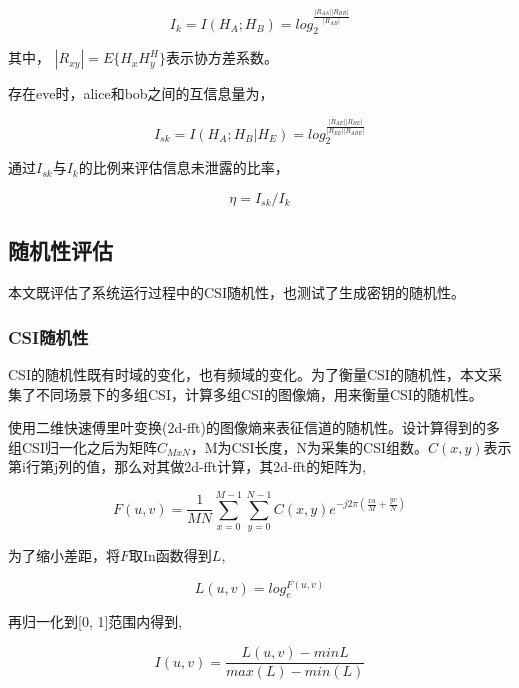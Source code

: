 \documentclass[master]{seuthesis} %
\begin{document}
\begin{Main}
\begin{equation}
    I_k = I(H_A; H_B) = log_2^{\frac{\left|R_{AA}\right|\left|R_{BB}\right|}{\left|R_{AB}\right|}}
\end{equation}

其中， $\left|R_{xy}\right| = E\{H_x H_y^H\}$表示协方差系数。

存在eve时，alice和bob之间的互信息量为， 

\begin{equation}
  I_{sk} = I(H_A; H_B | H_E) = log_2^{\frac{\left|R_{AE}\right|\left|R_{BE}\right|}{\left|R_{EE}\right|\left|R_{ABE}\right|}}
\end{equation}

通过$I_{sk}$与$I_k$的比例来评估信息未泄露的比率，

\begin{equation} \label{safe_rate_equation}
  \eta = I_{sk} / I_k
\end{equation}

\subsection{随机性评估}

本文既评估了系统运行过程中的CSI随机性，也测试了生成密钥的随机性。

\subsubsection{CSI随机性}

CSI的随机性既有时域的变化，也有频域的变化。为了衡量CSI的随机性，本文采集了不同场景下的多组CSI，计算多组CSI的图像熵，用来衡量CSI的随机性。

使用二维快速傅里叶变换(2d-fft)的图像熵来表征信道的随机性。设计算得到的多组CSI归一化之后为矩阵$C_{MxN}$，M为CSI长度，N为采集的CSI组数。$C(x, y)$表示第i行第j列的值，那么对其做2d-fft计算，其2d-fft的矩阵为,

\begin{equation}
  F(u, v) = \frac{1}{MN}\sum_{x=0}^{M-1}\sum_{y=0}^{N-1} C(x,y) e^{-j2\pi(\frac{xu}{M}+\frac{yv}{N})}
\end{equation}


为了缩小差距，将$F$取In函数得到$L$,

\begin{equation}
  L(u, v) = log_e^{F(u, v)}
\end{equation}

再归一化到[0, 1]范围内得到,

\begin{equation}
  I(u, v) = \frac{L(u, v) - min{L}}{max(L) - min(L)}
\end{equation}


\end{Main}
\end{document}
